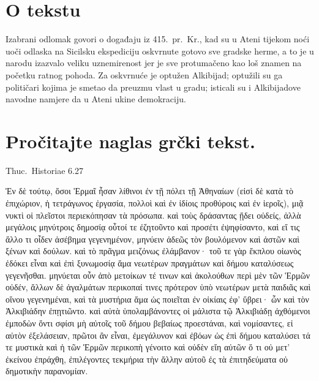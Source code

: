 

\section*{O tekstu}

Izabrani odlomak govori o događaju iz 415.\ pr.~Kr., kad su u Ateni tijekom noći uoči odlaska na Sicilsku ekspediciju oskvrnute gotovo sve gradske herme, a to je u narodu izazvalo veliku uznemirenost jer je sve protumačeno kao loš znamen na početku ratnog pohoda. Za oskvrnuće je optužen Alkibijad; optužili su ga političari kojima je smetao da preuzmu vlast u gradu; isticali su i Alkibijadove navodne namjere da u Ateni ukine demokraciju.


\section*{Pročitajte naglas grčki tekst.}

Thuc.\ Historiae 6.27


\medskip

\begin{greek}
{\large
{ \noindent Ἐν δὲ τούτῳ, ὅσοι Ἑρμαῖ ἦσαν λίθινοι ἐν τῇ πόλει τῇ Ἀθηναίων (εἰσὶ δὲ κατὰ τὸ ἐπιχώριον, ἡ τετράγωνος ἐργασία, πολλοὶ καὶ ἐν ἰδίοις προθύροις καὶ ἐν ἱεροῖς), μιᾷ νυκτὶ οἱ πλεῖστοι περιεκόπησαν τὰ πρόσωπα. καὶ τοὺς δράσαντας ᾔδει οὐδείς, ἀλλὰ μεγάλοις μηνύτροις δημοσίᾳ οὗτοί τε ἐζητοῦντο καὶ προσέτι ἐψηφίσαντο, καὶ εἴ τις ἄλλο τι οἶδεν ἀσέβημα γεγενημένον, μηνύειν ἀδεῶς τὸν βουλόμενον καὶ ἀστῶν καὶ ξένων καὶ δούλων. καὶ τὸ πρᾶγμα μειζόνως ἐλάμβανον· τοῦ τε γὰρ ἔκπλου οἰωνὸς ἐδόκει εἶναι καὶ ἐπὶ ξυνωμοσίᾳ ἅμα νεωτέρων πραγμάτων καὶ δήμου καταλύσεως  γεγενῆσθαι. μηνύεται οὖν ἀπὸ μετοίκων τέ τινων καὶ ἀκολούθων περὶ μὲν τῶν Ἑρμῶν οὐδέν, ἄλλων δὲ ἀγαλμάτων περικοπαί τινες πρότερον ὑπὸ νεωτέρων μετὰ παιδιᾶς καὶ οἴνου γεγενημέναι, καὶ τὰ μυστήρια ἅμα ὡς ποιεῖται ἐν οἰκίαις ἐφ' ὕβρει· ὧν καὶ τὸν Ἀλκιβιάδην ἐπῃτιῶντο. καὶ αὐτὰ ὑπολαμβάνοντες οἱ μάλιστα τῷ Ἀλκιβιάδῃ ἀχθόμενοι ἐμποδὼν ὄντι σφίσι μὴ αὐτοῖς τοῦ δήμου βεβαίως προεστάναι, καὶ νομίσαντες, εἰ αὐτὸν ἐξελάσειαν, πρῶτοι ἂν εἶναι, ἐμεγάλυνον καὶ ἐβόων ὡς ἐπὶ δήμου καταλύσει τά τε μυστικὰ καὶ ἡ τῶν Ἑρμῶν περικοπὴ γένοιτο καὶ οὐδὲν εἴη αὐτῶν ὅ τι οὐ μετ' ἐκείνου ἐπράχθη, ἐπιλέγοντες τεκμήρια τὴν ἄλλην αὐτοῦ ἐς τὰ ἐπιτηδεύματα οὐ δημοτικὴν παρανομίαν. 

}
}
\end{greek}


